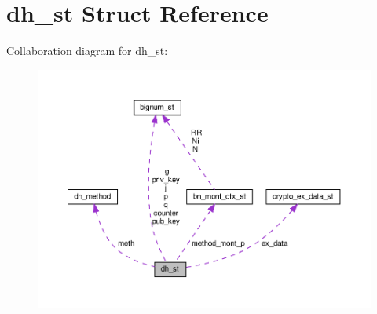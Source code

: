 \hypertarget{structdh__st}{}\section{dh\+\_\+st Struct Reference}
\label{structdh__st}


Collaboration diagram for dh\+\_\+st\+:
\nopagebreak
\begin{figure}[H]
\begin{center}
\leavevmode
\includegraphics[width=350pt]{structdh__st__coll__graph}
\end{center}
\end{figure}
